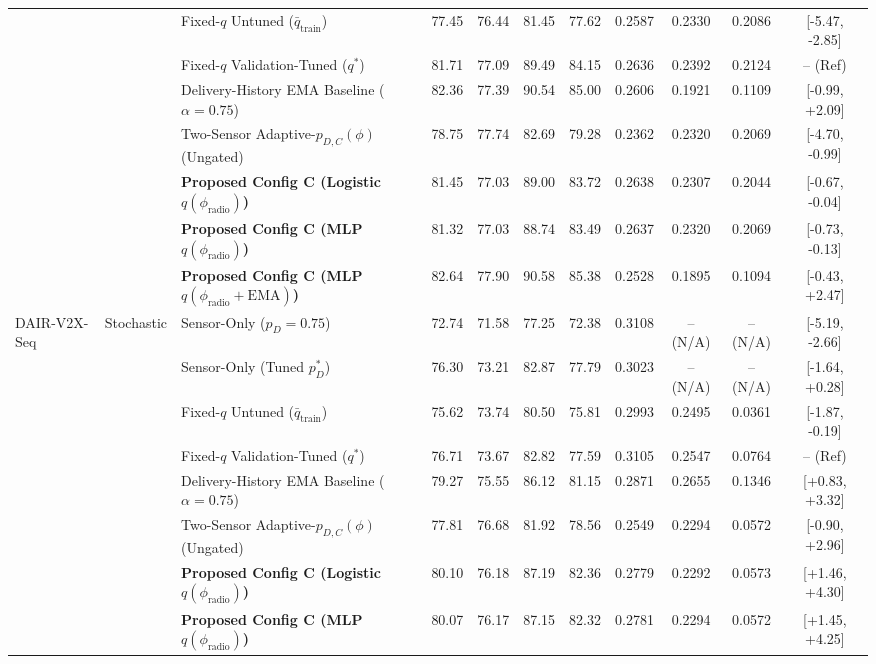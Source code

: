 \begin{table}[!t]
\begin{tabular}{lllcccccccc}
 &  & Fixed-$q$ Untuned ($\bar{q}_{\text{train}}$) & 77.45 & 76.44 & 81.45 & 77.62 & 0.2587 & 0.2330 & 0.2086 & [-5.47, -2.85] \\
 &  & Fixed-$q$ Validation-Tuned ($q^*$) & 81.71 & 77.09 & 89.49 & 84.15 & 0.2636 & 0.2392 & 0.2124 & -- (Ref) \\
 &  & Delivery-History EMA Baseline ($\alpha=0.75$) & 82.36 & 77.39 & 90.54 & 85.00 & 0.2606 & 0.1921 & 0.1109 & [-0.99, +2.09] \\
 &  & Two-Sensor Adaptive-$p_{D,C}(\phi)$ (Ungated) & 78.75 & 77.74 & 82.69 & 79.28 & 0.2362 & 0.2320 & 0.2069 & [-4.70, -0.99] \\
 &  & \textbf{Proposed Config C (Logistic $q(\phi_{\text{radio}})$)} & 81.45 & 77.03 & 89.00 & 83.72 & 0.2638 & 0.2307 & 0.2044 & [-0.67, -0.04] \\
 &  & \textbf{Proposed Config C (MLP $q(\phi_{\text{radio}})$)} & 81.32 & 77.03 & 88.74 & 83.49 & 0.2637 & 0.2320 & 0.2069 & [-0.73, -0.13] \\
 &  & \textbf{Proposed Config C (MLP $q(\phi_{\text{radio}}+\text{EMA})$)} & 82.64 & 77.90 & 90.58 & 85.38 & 0.2528 & 0.1895 & 0.1094 & [-0.43, +2.47] \\
\midrule
DAIR-V2X-Seq & Stochastic & Sensor-Only ($p_D=0.75$) & 72.74 & 71.58 & 77.25 & 72.38 & 0.3108 & -- (N/A) & -- (N/A) & [-5.19, -2.66] \\
 &  & Sensor-Only (Tuned $p_D^*$) & 76.30 & 73.21 & 82.87 & 77.79 & 0.3023 & -- (N/A) & -- (N/A) & [-1.64, +0.28] \\
 &  & Fixed-$q$ Untuned ($\bar{q}_{\text{train}}$) & 75.62 & 73.74 & 80.50 & 75.81 & 0.2993 & 0.2495 & 0.0361 & [-1.87, -0.19] \\
 &  & Fixed-$q$ Validation-Tuned ($q^*$) & 76.71 & 73.67 & 82.82 & 77.59 & 0.3105 & 0.2547 & 0.0764 & -- (Ref) \\
 &  & Delivery-History EMA Baseline ($\alpha=0.75$) & 79.27 & 75.55 & 86.12 & 81.15 & 0.2871 & 0.2655 & 0.1346 & [+0.83, +3.32] \\
 &  & Two-Sensor Adaptive-$p_{D,C}(\phi)$ (Ungated) & 77.81 & 76.68 & 81.92 & 78.56 & 0.2549 & 0.2294 & 0.0572 & [-0.90, +2.96] \\
 &  & \textbf{Proposed Config C (Logistic $q(\phi_{\text{radio}})$)} & 80.10 & 76.18 & 87.19 & 82.36 & 0.2779 & 0.2292 & 0.0573 & [+1.46, +4.30] \\
 &  & \textbf{Proposed Config C (MLP $q(\phi_{\text{radio}})$)} & 80.07 & 76.17 & 87.15 & 82.32 & 0.2781 & 0.2294 & 0.0572 & [+1.45, +4.25] \\

\end{tabular}
\end{table}
